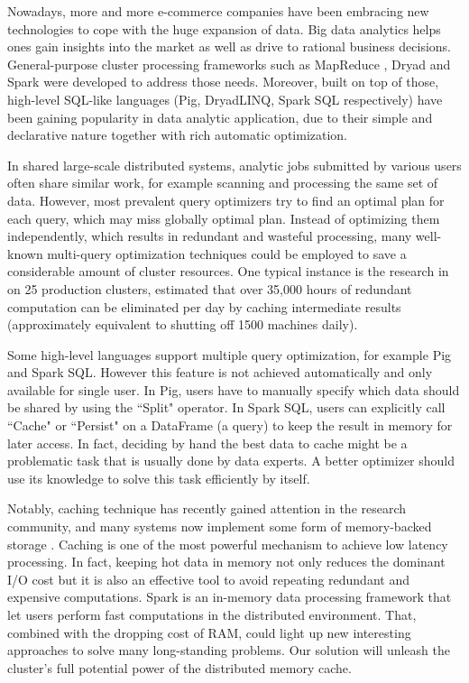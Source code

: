 Nowadays, more and more e-commerce companies have been embracing new technologies to cope with the huge expansion of data. Big data analytics helps ones gain insights into the market as well as drive to rational business decisions. General-purpose cluster processing frameworks such as MapReduce \cite{dean2008mapreduce}, Dryad \cite{isard2007dryad} and Spark \cite{zaharia2012resilient} were developed to address those needs. Moreover, built on top of those, high-level SQL-like languages (Pig, DryadLINQ, Spark SQL respectively) have been gaining popularity in data analytic application, due to their simple and declarative nature together with rich automatic optimization.

In shared large-scale distributed systems, analytic jobs submitted by various users often share similar work, for example scanning and processing the same set of data. However, most prevalent query optimizers try to find an optimal plan for each query, which may miss globally optimal plan. Instead of optimizing them independently, which results in redundant and wasteful processing, many well-known multi-query optimization techniques could be employed to save a considerable amount of cluster resources. One typical instance is the research in \cite{gunda2010nectar} on 25 production clusters, estimated that over 35,000 hours of redundant computation can be eliminated per day by caching intermediate results (approximately equivalent to shutting off 1500 machines daily).

Some high-level languages support multiple query optimization, for example Pig and Spark SQL. However this feature is not achieved automatically and only available for single user. In Pig, users have to manually specify which data should be shared by using the ``Split" operator. In Spark SQL, users can explicitly call ``Cache" or ``Persist" on a DataFrame (a query) to keep the result in memory for later access. In fact, deciding by hand the best data to cache might be a problematic task that is usually done by data experts. A better optimizer should use its knowledge to solve this task efficiently by itself.

Notably, caching technique has recently gained attention in the research community, and many systems now implement some form of memory-backed storage \cite{tachyon, hdfs}. Caching is one of the most powerful mechanism to achieve low latency processing. In fact, keeping hot data in memory not only reduces the dominant I/O cost but it is also an effective tool to avoid repeating redundant and expensive computations. Spark is an in-memory data processing framework that let users perform fast computations in the distributed environment. That, combined with the dropping cost of RAM, could light up new interesting approaches to solve many long-standing problems. Our solution will unleash the cluster's full potential power of the distributed memory cache.

